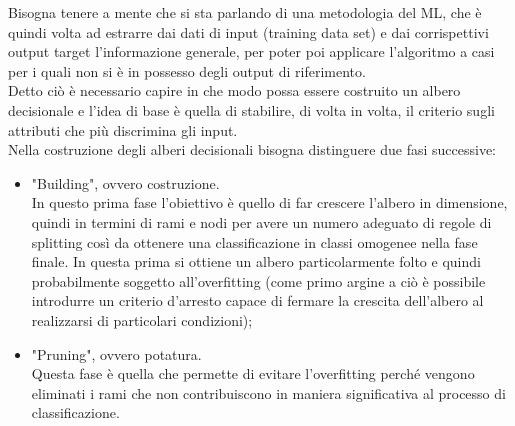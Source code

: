 Bisogna tenere a mente che si sta parlando di una metodologia del ML, che è quindi volta ad estrarre dai dati di input (training data set) e dai corrispettivi output target l'informazione generale, per poter poi applicare l'algoritmo a casi per i quali non si è in possesso degli output di riferimento.\\
Detto ciò è necessario capire in che modo possa essere costruito un albero decisionale e l'idea di base è quella di stabilire, di volta in volta, il criterio sugli attributi che più discrimina gli input. \\
Nella costruzione degli alberi decisionali bisogna distinguere due fasi successive:
\begin{itemize}
	\item "Building", ovvero costruzione.\\
	In questo prima fase l'obiettivo è quello di far crescere l'albero in dimensione, quindi in termini di rami e nodi per avere un numero adeguato di regole di splitting così da ottenere una classificazione in classi omogenee nella fase finale. In questa prima si ottiene un albero particolarmente folto e quindi probabilmente soggetto all'overfitting (come primo argine a ciò è possibile introdurre un criterio d'arresto capace di fermare la crescita dell'albero al realizzarsi di particolari condizioni);
	\item "Pruning", ovvero potatura.\\
	Questa fase è quella che permette di evitare l'overfitting perché vengono eliminati i rami che non contribuiscono in maniera significativa al processo di classificazione.
	
\end{itemize} 

